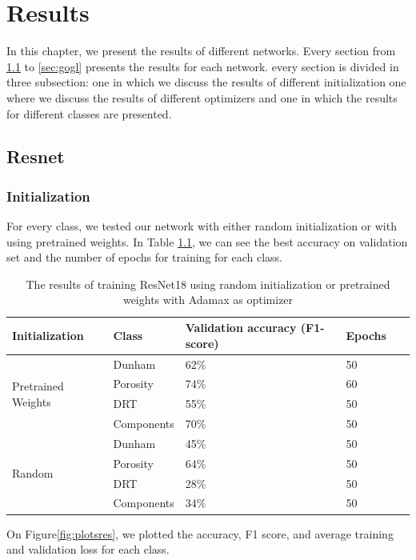\chapter{Results}\label{chp:results}

In this chapter, we present the results of different networks. Every section from \ref{sec:res} to \ref{sec:gogl} presents the results for each network. every section is divided in three subsection: one in which we discuss the results of different initialization one where we discuss the results of different optimizers and one in which the results for different classes are presented. 
\section{Resnet}\label{sec:res}
\subsection{Initialization}
For every class, we tested our network with either random initialization or with using pretrained weights. In Table \ref{tab:resinit}, we can see the best accuracy on validation set and the number of epochs for training for each class.  

\begin{table}
\caption{\label{tab:resinit} The results of training ResNet18 using random initialization or pretrained weights with Adamax as optimizer}
\centering
\begin{tabular}[b]{| l | l | l | l | l |}
\hline
    Initialization & Class & Validation accuracy (F1-score) & Epochs\ \\ \hline
    \multirow{4}{*}{Pretrained Weights} & Dunham &  62\%  & 50 \\ 
    & Porosity & 74\%  &  60 \\
    &DRT & 55\% &  50 \\
    &Components & 70\% &  50 \\ \hline
     \multirow{4}{*}{Random} & Dunham &  45\%  & 50 \\
    & Porosity & 64\% &  50 \\
    &DRT & 28\% & 50 \\
    &Components & 34\% &  50 \\ \hline
    
\end{tabular} 
\end{table}
On Figure\ref{fig:plotsres}, we plotted the accuracy, F1 score, and average training and validation loss for each class. 




